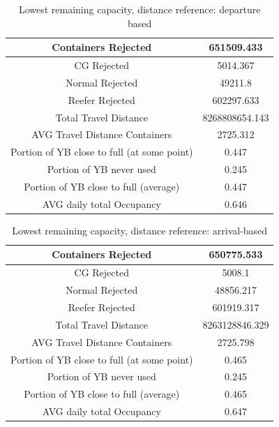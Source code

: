 \documentclass{article}
\begin{document}
\begin{table}[h]
    \centering
    \begin{tabular}{|c|c|}
        \hline
        Containers Rejected                         & 651509.433     \\ \hline
        CG Rejected                                 & 5014.367       \\ \hline
        Normal Rejected                             & 49211.8        \\ \hline
        Reefer Rejected                             & 602297.633     \\ \hline
        Total Travel Distance                       & 8268808654.143 \\ \hline
        AVG Travel Distance Containers              & 2725.312       \\ \hline
        Portion of YB close to full (at some point) & 0.447          \\ \hline
        Portion of YB never used                    & 0.245          \\ \hline
        Portion of YB close to full (average)       & 0.447          \\ \hline
        AVG daily total Occupancy                   & 0.646          \\ \hline
    \end{tabular}
    \caption{Lowest remaining capacity, distance reference: departure based}
\end{table}

\begin{table}[h]
    \centering
    \begin{tabular}{|c|c|}
        \hline
        Containers Rejected                         & 650775.533     \\ \hline
        CG Rejected                                 & 5008.1         \\ \hline
        Normal Rejected                             & 48856.217      \\ \hline
        Reefer Rejected                             & 601919.317     \\ \hline
        Total Travel Distance                       & 8263128846.329 \\ \hline
        AVG Travel Distance Containers              & 2725.798       \\ \hline
        Portion of YB close to full (at some point) & 0.465          \\ \hline
        Portion of YB never used                    & 0.245          \\ \hline
        Portion of YB close to full (average)       & 0.465          \\ \hline
        AVG daily total Occupancy                   & 0.647          \\ \hline
    \end{tabular}
    \caption{Lowest remaining capacity, distance reference: arrival-based}
\end{table}
\end{document}
